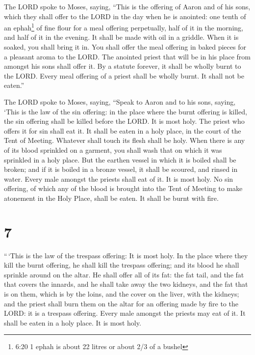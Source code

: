  The LORD spoke to Moses, saying,  ``This is
the offering of Aaron and of his sons, which they shall offer to the
LORD in the day when he is anointed: one tenth of an ephah\footnote{6:20
  1 ephah is about 22 litres or about 2/3 of a bushel} of fine flour for
a meal offering perpetually, half of it in the morning, and half of it
in the evening.  It shall be made with oil in a griddle.
When it is soaked, you shall bring it in. You shall offer the meal
offering in baked pieces for a pleasant aroma to the LORD. 
The anointed priest that will be in his place from amongst his sons
shall offer it. By a statute forever, it shall be wholly burnt to the
LORD.  Every meal offering of a priest shall be wholly
burnt. It shall not be eaten.''

 The LORD spoke to Moses, saying,  ``Speak to
Aaron and to his sons, saying, `This is the law of the sin offering: in
the place where the burnt offering is killed, the sin offering shall be
killed before the LORD. It is most holy.  The priest who
offers it for sin shall eat it. It shall be eaten in a holy place, in
the court of the Tent of Meeting.  Whatever shall touch its
flesh shall be holy. When there is any of its blood sprinkled on a
garment, you shall wash that on which it was sprinkled in a holy place.
 But the earthen vessel in which it is boiled shall be
broken; and if it is boiled in a bronze vessel, it shall be scoured, and
rinsed in water.  Every male amongst the priests shall eat
of it. It is most holy.  No sin offering, of which any of
the blood is brought into the Tent of Meeting to make atonement in the
Holy Place, shall be eaten. It shall be burnt with fire.

\hypertarget{section-6}{%
\section{7}\label{section-6}}

 ``\,`This is the law of the trespass offering: It is most
holy.  In the place where they kill the burnt offering, he
shall kill the trespass offering; and its blood he shall sprinkle around
on the altar.  He shall offer all of its fat: the fat tail,
and the fat that covers the innards,  and he shall take away
the two kidneys, and the fat that is on them, which is by the loins, and
the cover on the liver, with the kidneys;  and the priest
shall burn them on the altar for an offering made by fire to the LORD:
it is a trespass offering.  Every male amongst the priests
may eat of it. It shall be eaten in a holy place. It is most holy.

